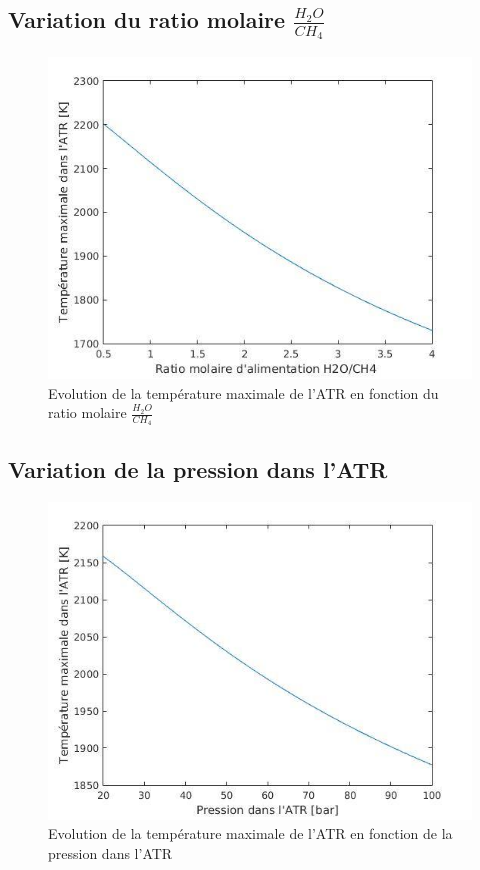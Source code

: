 \documentclass[12pt]{report}
\begin{document}
\subsection{Variation du ratio molaire $\frac{H_2O}{CH_4}$}


\begin{figure}[H]
\begin{center}
\includegraphics[scale=0.6]{Tmax_ratio_H2O}
\caption{Evolution de la température maximale de l'ATR en fonction du ratio molaire $\frac{H_2O}{CH_4}$}
\end{center}
\end{figure}

\subsection{Variation de la pression dans l'ATR}

\begin{figure}[H]
\begin{center}
\includegraphics[scale=0.6]{Tmax_pression_ATR}
\caption{Evolution de la température maximale de l'ATR en fonction de la pression dans l'ATR}
\end{center}
\end{figure}
\end{document}

